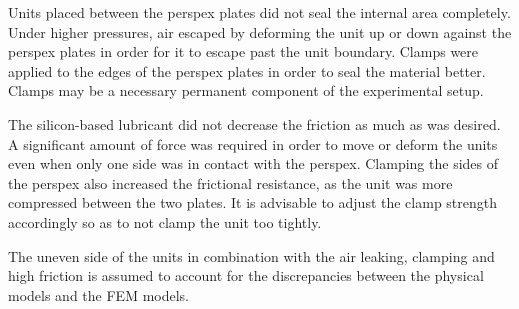 Units placed between the perspex plates did not seal the internal area completely. Under higher pressures, air escaped by deforming the unit up or down against the perspex plates in order for it to escape past the unit boundary. Clamps were applied to the edges of the perspex plates in order to seal the material better. Clamps may be a necessary permanent component of the experimental setup.

The silicon-based lubricant did not decrease the friction as much as was desired. A significant amount of force was required in order to move or deform the units even when only one side was in contact with the perspex. Clamping the sides of the perspex also increased the frictional resistance, as the unit was more compressed between the two plates. It is advisable to adjust the clamp strength accordingly so as to not clamp the unit too tightly.

The uneven side of the units in combination with the air leaking, clamping and high friction is assumed to account for the discrepancies between the physical models and the FEM models.